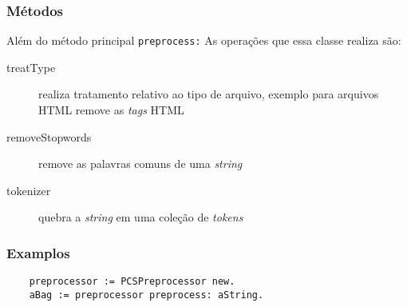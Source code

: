 \subsubsection{Métodos} 
Além do método principal \texttt{preprocess:} 
As operações que essa classe realiza são:
\begin{description}
    \item[treatType] realiza tratamento relativo ao tipo de arquivo, exemplo para arquivos HTML
                     remove as \textit{tags} HTML
    \item[removeStopwords] remove as palavras comuns de uma \textit{string}
    \item[tokenizer] quebra a \textit{string} em uma coleção de \textit{tokens}
\end{description}

\subsubsection{Examplos}
    \begin{verbatim}
    preprocessor := PCSPreprocessor new.
    aBag := preprocessor preprocess: aString.
    \end{verbatim}  


